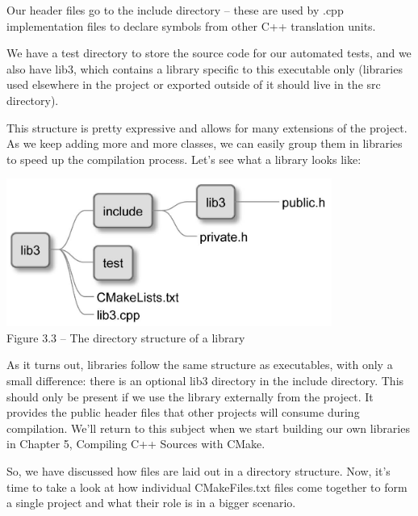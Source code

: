 Our header files go to the include directory – these are used by .cpp implementation files to declare symbols from other C++ translation units.

We have a test directory to store the source code for our automated tests, and we also have lib3, which contains a library specific to this executable only (libraries used elsewhere in the project or exported outside of it should live in the src directory).

This structure is pretty expressive and allows for many extensions of the project. As we keep adding more and more classes, we can easily group them in libraries to speed up the compilation process. Let's see what a library looks like:

\begin{center}
\includegraphics[width=0.8\textwidth]{content/1/chapter3/images/3.jpg}\\
Figure 3.3 – The directory structure of a library
\end{center}

As it turns out, libraries follow the same structure as executables, with only a small difference: there is an optional lib3 directory in the include directory. This should only be present if we use the library externally from the project. It provides the public header files that other projects will consume during compilation. We'll return to this subject when we start building our own libraries in Chapter 5, Compiling C++ Sources with CMake.

So, we have discussed how files are laid out in a directory structure. Now, it's time to take a look at how individual CMakeFiles.txt files come together to form a single project and what their role is in a bigger scenario.

